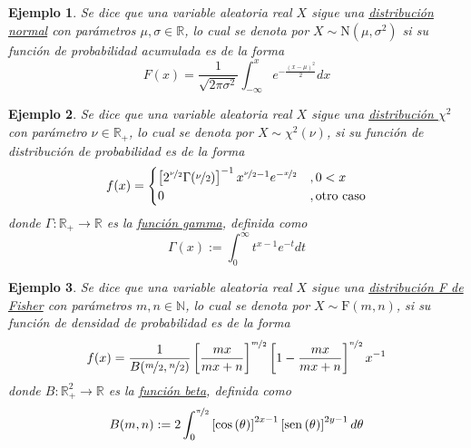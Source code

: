 \documentclass[12pt,letterpaper]{book}
\newtheorem{ejemplo}{Ejemplo}[chapter]
\newcommand{\R}{\mathbb{R}}
\newcommand{\N}{\mathbb{N}}
\newcommand{\COS}[1]{\mathrm{cos}\left( #1 \right)}
\newcommand{\SEN}[1]{\mathrm{sen}\left( #1 \right)}
\begin{document}
\begin{ejemplo}
Se dice que una variable aleatoria real $X$ sigue una \ul{distribuci\'on normal} con parámetros $\mu, \sigma \in \R$, lo cual se denota por $X\sim \text{N}(\mu,\sigma^{2})$ si su función de probabilidad acumulada es de la forma
\begin{equation}
F(x) = \frac{1}{\sqrt{2 \pi \sigma^{2}}} \int_{-\infty}^{x} e^{-\frac{(x-\mu)^{2}}{2}} dx
\end{equation}
\end{ejemplo}

\begin{ejemplo}
Se dice que una variable aleatoria real $X$ sigue una \ul{distribuci\'on $\chi^2$} con parámetro $\nu\in \R_+$, lo cual se denota por $X\sim \chi^2(\nu)$, si su función de distribución de probabilidad es de la forma
\begin{equation}
f(x) = \begin{cases}
\left[ 2^{\nicefrac{\nu}{2}} \Gamma(\nicefrac{\nu}{2}) \right]^{-1} x^{\nicefrac{\nu}{2}-1} e^{-\nicefrac{x}{2}} &, 0 < x \\
0 &, \text{otro caso}
\end{cases}
\end{equation}
donde $\Gamma: \R_+ \rightarrow \R$ es la \underline{función gamma}, definida como
\begin{equation}
\Gamma(x) := \int_{0}^{\infty} t^{x-1} e^{-t} dt
\end{equation}
\end{ejemplo}

\begin{ejemplo}
Se dice que una variable aleatoria real $X$ sigue una \ul{distribuci\'on F de Fisher} con parámetros $m, n \in \N$, lo cual se denota por $X\sim \text{F}(m,n)$, si su función de densidad de probabilidad es de la forma
\begin{equation}
f(x) = \frac{1}{B(\nicefrac{m}{2},\nicefrac{n}{2})} \left[ \frac{m x}{m x + n} \right]^{\nicefrac{m}{2}} \left[ 1- \frac{m x}{m x + n} \right]^{\nicefrac{n}{2}} x^{-1}
\end{equation}
donde $B: \R_+^2 \rightarrow \R$ es la \underline{función beta}, definida como
\begin{equation}
B(m,n) := 2 \int_0^{\nicefrac{\pi}{2}} \left[\COS{\theta} \right]^{2x-1} \left[\SEN{\theta} \right]^{2y-1} d\theta
\end{equation}
\end{ejemplo}

\end{document}
